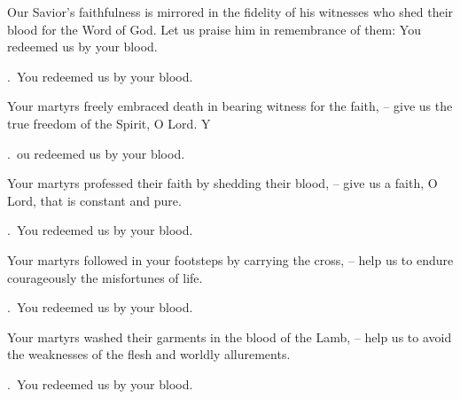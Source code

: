 \lettrine[loversize=0.15,lines=2]{O}{}ur Savior’s faithfulness is mirrored in the fidelity of his witnesses who shed their blood for the Word of God. Let us praise him in remembrance of them: You redeemed us by your blood.
\par \Rbar.~You redeemed us by your blood.

Your martyrs freely embraced death in bearing witness for the faith,
– give us the true freedom of the Spirit, O Lord.
Y\par \Rbar.~ou redeemed us by your blood.

Your martyrs professed their faith by shedding their blood,
– give us a faith, O Lord, that is constant and pure.
\par \Rbar.~You redeemed us by your blood.

Your martyrs followed in your footsteps by carrying the cross,
– help us to endure courageously the misfortunes of life.
\par \Rbar.~You redeemed us by your blood.

Your martyrs washed their garments in the blood of the Lamb,
– help us to avoid the weaknesses of the flesh and worldly allurements.
\par \Rbar.~You redeemed us by your blood.
